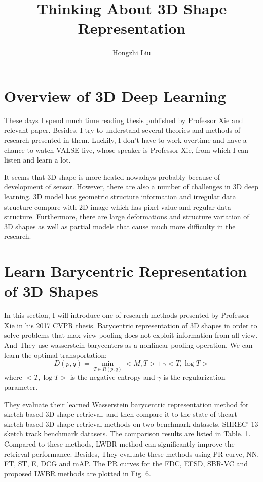 \documentclass{article}
\author{Hongzhi Liu}
\title{Thinking About 3D Shape Representation}
\begin{document}
\maketitle
  \par
  \section{Overview of 3D Deep Learning}
  These days I spend much time reading thesis published by Professor Xie and relevant paper. Besides, I try to understand several theories and methods of research presented in them. Luckily, I don't have to work overtime and have a chance to watch VALSE live, whose speaker is Professor Xie, from which I can listen and learn a lot.

  It seems that 3D shape is more heated nowadays probably because of development of sensor. However, there are also a number of challenges in 3D deep learning. 3D model has geometric structure information and irregular data structure compare with 2D image which has pixel value and regular data structure. Furthermore, there are large deformations and structure variation of 3D shapes as well as partial models that cause much more difficulty in the research.

\section{Learn Barycentric Representation of 3D Shapes}

  In this section, I will introduce one of research methods presented by Professor Xie in his 2017 CVPR thesis. Barycentric representation of 3D shapes in order to solve problems that max-view pooling does not exploit information from all view. And They use wasserstein barycenters as a nonlinear pooling operation. We can learn the optimal transportation\cite{Cuturi2013Sinkhorn}:
\begin{equation}
  D(p,q) = \min_{T \in R(p,q)}<M,T> + \gamma<T,\log T>
 \end{equation}
  where $ < T,\log T > $ is the negative entropy and $ \gamma $ is the regularization parameter.

  They evaluate their learned Wasserstein barycentric representation method for sketch-based 3D shape retrieval, and then compare it to the state-of-theart sketch-based 3D shape retrieval methods on two benchmark datasets, SHREC' 13 sketch track benchmark datasets. The comparison results are listed in Table. 1. Compared to these methods, LWBR method can significantly improve the retrieval performance. Besides, They evaluate these methods using PR curve, NN, FT, ST, E, DCG and mAP. The PR curves for the FDC, EFSD, SBR-VC and proposed LWBR methods are plotted in Fig. 6.
\end{document}
